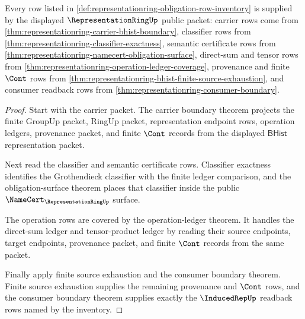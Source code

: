 \begin{theorem}
\label{thm:representationring-obligation-inventory-sound}
Every row listed in
\autoref{def:representationring-obligation-row-inventory} is supplied by the
displayed $\RepresentationRingUp$ public packet: carrier rows come from
\autoref{thm:representationring-carrier-bhist-boundary}, classifier rows from
\autoref{thm:representationring-classifier-exactness}, semantic certificate
rows from \autoref{thm:representationring-namecert-obligation-surface},
direct-sum and tensor rows from
\autoref{thm:representationring-operation-ledger-coverage}, provenance and
finite $\Cont$ rows from
\autoref{thm:representationring-bhist-finite-source-exhaustion}, and consumer
readback rows from \autoref{thm:representationring-consumer-boundary}.
\end{theorem}
\begin{proof}
Start with the carrier packet. The carrier boundary theorem projects the
finite GroupUp packet, RingUp packet, representation endpoint rows, operation
ledgers, provenance packet, and finite $\Cont$ records from the displayed
$\mathsf{BHist}$ representation packet.

Next read the classifier and semantic certificate rows. Classifier exactness
identifies the Grothendieck classifier with the finite ledger comparison, and
the obligation-surface theorem places that classifier inside the public
$\NameCert_{\RepresentationRingUp}$ surface.

The operation rows are covered by the operation-ledger theorem. It handles the
direct-sum ledger and tensor-product ledger by reading their source endpoints,
target endpoints, provenance packet, and finite $\Cont$ records from the same
packet.

Finally apply finite source exhaustion and the consumer boundary theorem.
Finite source exhaustion supplies the remaining provenance and $\Cont$ rows,
and the consumer boundary theorem supplies exactly the $\InducedRepUp$
readback rows named by the inventory.
\end{proof}


